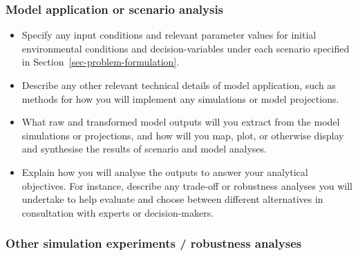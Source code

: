 \documentclass[
]{article}
\providecommand{\tightlist}{%
  \setlength{\itemsep}{0pt}\setlength{\parskip}{0pt}}
\begin{document}
\subsubsection{Model application or scenario
analysis}\label{model-application-or-scenario-analysis}

\begin{tcolorbox}[enhanced jigsaw, opacitybacktitle=0.6, bottomrule=.15mm, leftrule=.75mm, rightrule=.15mm, colbacktitle=quarto-callout-caution-color!10!white, toprule=.15mm, titlerule=0mm, left=2mm, colframe=quarto-callout-caution-color-frame, breakable, title=\textcolor{quarto-callout-caution-color}{\faFire}\hspace{0.5em}{Preregistration Item}, opacityback=0, coltitle=black, bottomtitle=1mm, colback=white, toptitle=1mm, arc=.35mm]

\begin{itemize}
\tightlist
\item[$\square$]
  Specify any input conditions and relevant parameter values for initial
  environmental conditions and decision-variables under each scenario
  specified in Section~\ref{sec-problem-formulation}.
\item[$\square$]
  Describe any other relevant technical details of model application,
  such as methods for how you will implement any simulations or model
  projections.
\item[$\square$]
  What raw and transformed model outputs will you extract from the model
  simulations or projections, and how will you map, plot, or otherwise
  display and synthesise the results of scenario and model analyses.
\item[$\square$]
  Explain how you will analyse the outputs to answer your analytical
  objectives. For instance, describe any trade-off or robustness
  analyses you will undertake to help evaluate and choose between
  different alternatives in consultation with experts or
  decision-makers.
\end{itemize}

\end{tcolorbox}

\subsubsection{Other simulation experiments / robustness
analyses}\label{other-simulation-experiments-robustness-analyses}
\end{document}
